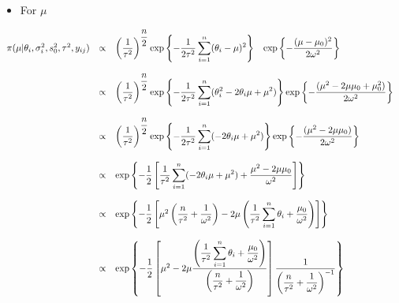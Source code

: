 \documentclass[a4paper, 11pt]{article}
\begin{document}
\begin{itemize}
\item For $\mu$
\end{itemize}
\begin{equation*}
\begin{array}{lcl ll }

\pi( \mu|\theta_i, \sigma_i^2, s_0^2, \tau^2, y_{ij}) & \propto & \left(\dfrac{1}{\tau^2}\right)^{\dfrac{n}{2}}\mbox{exp}\left\{ - \dfrac{1}{2\tau^2} 
\displaystyle\sum_{i=1}^{n} (\theta_i - \mu)^2\right\}  \hspace{0.3cm}\mbox{exp}\left\{ - \dfrac{(\mu - \mu_0)^2}{2\omega^2}\right\} \\ \\

& \propto & \left(\dfrac{1}{\tau^2}\right)^{\dfrac{n}{2}}\mbox{exp}\left\{ - \dfrac{1}{2\tau^2} 
\displaystyle\sum_{i=1}^{n} (\theta_i^2 - 2\theta_i\mu + \mu^2)\right\} \mbox{exp}\left\{ - \dfrac{(\mu^2 - 2\mu\mu_0 + \mu_0^2)}{2\omega^2}\right\}  \\ \\

& \propto & \left(\dfrac{1}{\tau^2}\right)^{\dfrac{n}{2}}\mbox{exp}\left\{ - \dfrac{1}{2\tau^2} 
\displaystyle\sum_{i=1}^{n} (- 2\theta_i\mu + \mu^2)\right\} \mbox{exp}\left\{ - \dfrac{(\mu^2 - 2\mu\mu_0)}{2\omega^2}\right\}  \\ \\

& \propto & \mbox{exp}\left\{ - \dfrac{1}{2} \left[ \dfrac{1}{\tau^2} \displaystyle\sum_{i=1}^{n} (- 2\theta_i\mu + \mu^2) + \dfrac{\mu^2 - 2\mu\mu_0}{\omega^2} \right] \right\} \\ \\

& \propto & \mbox{exp}\left\{ - \dfrac{1}{2} \left[ \mu^2 \left( \dfrac{n}{\tau^2} +\dfrac{1}{\omega^2} \right) - 2\mu \left(\dfrac{1}{\tau^2}\displaystyle\sum_{i=1}^{n} \theta_i + \dfrac{\mu_0}{\omega^2} \right) \right] \right\} \\ \\

& \propto & \mbox{exp}\left\{ - \dfrac{1}{2} \left[ \mu^2 - 2\mu \dfrac{ \left(\dfrac{1}{\tau^2}\displaystyle\sum_{i=1}^{n} \theta_i + \dfrac{\mu_0}{\omega^2} \right)}{\left( \dfrac{n}{\tau^2} +\dfrac{1}{\omega^2} \right)} \right] \dfrac{1}{\left( \dfrac{n}{\tau^2} +\dfrac{1}{\omega^2} \right)^{-1}}\right\} \\ \\

 \end{array}
\end{equation*}
\end{document}
